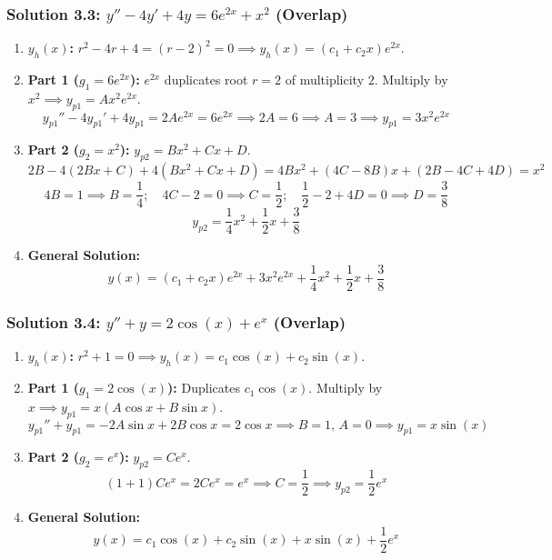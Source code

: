 \documentclass[11pt,letterpaper]{article}
\begin{document}
\subsubsection*{Solution 3.3: $y'' - 4y' + 4y = 6e^{2x} + x^2$ \quad (\textbf{Overlap})}
\begin{enumerate}
    \item \textbf{$y_h(x)$:} $r^2 - 4r + 4 = (r-2)^2 = 0 \implies y_h(x) = (c_1 + c_2 x) e^{2x}$.
    \item \textbf{Part 1 ($g_1 = 6e^{2x}$):} $e^{2x}$ duplicates root $r=2$ of multiplicity $2$. Multiply by $x^2 \implies y_{p1} = A x^2 e^{2x}$.
    \[ y_{p1}'' - 4y_{p1}' + 4y_{p1} = 2A e^{2x} = 6e^{2x} \implies 2A = 6 \implies A = 3 \implies y_{p1} = 3x^2 e^{2x} \]
    \item \textbf{Part 2 ($g_2 = x^2$):} $y_{p2} = B x^2 + C x + D$.
    \[ 2B - 4(2Bx + C) + 4(Bx^2 + Cx + D) = 4B x^2 + (4C - 8B)x + (2B - 4C + 4D) = x^2 \]
    \[ 4B = 1 \implies B = \frac{1}{4}; \quad 4C - 2 = 0 \implies C = \frac{1}{2}; \quad \frac{1}{2} - 2 + 4D = 0 \implies D = \frac{3}{8} \]
    \[ y_{p2} = \frac{1}{4}x^2 + \frac{1}{2}x + \frac{3}{8} \]
    \item \textbf{General Solution:}
    \[ y(x) = (c_1 + c_2 x) e^{2x} + 3x^2 e^{2x} + \frac{1}{4}x^2 + \frac{1}{2}x + \frac{3}{8} \]
\end{enumerate}

\subsubsection*{Solution 3.4: $y'' + y = 2\cos(x) + e^x$ \quad (\textbf{Overlap})}
\begin{enumerate}
    \item \textbf{$y_h(x)$:} $r^2 + 1 = 0 \implies y_h(x) = c_1 \cos(x) + c_2 \sin(x)$.
    \item \textbf{Part 1 ($g_1 = 2\cos(x)$):} Duplicates $c_1 \cos(x)$. Multiply by $x \implies y_{p1} = x(A \cos x + B \sin x)$.
    \[ y_{p1}'' + y_{p1} = -2A \sin x + 2B \cos x = 2\cos x \implies B = 1, \, A = 0 \implies y_{p1} = x \sin(x) \]
    \item \textbf{Part 2 ($g_2 = e^x$):} $y_{p2} = C e^x$.
    \[ (1 + 1)C e^x = 2C e^x = e^x \implies C = \frac{1}{2} \implies y_{p2} = \frac{1}{2}e^x \]
    \item \textbf{General Solution:}
    \[ y(x) = c_1 \cos(x) + c_2 \sin(x) + x \sin(x) + \frac{1}{2}e^x \]
\end{enumerate}
\end{document}

